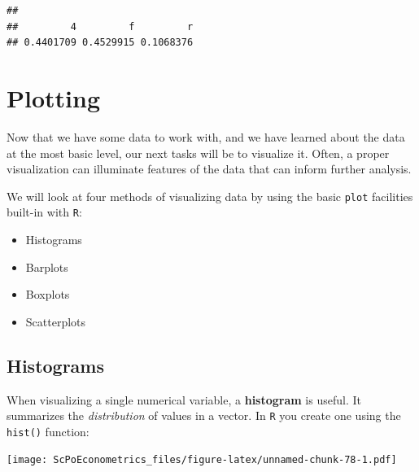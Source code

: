 \documentclass[]{book}
\newenvironment{Shaded}{\begin{snugshade}}{\end{snugshade}}
\newcommand{\KeywordTok}[1]{\textcolor[rgb]{0.13,0.29,0.53}{\textbf{#1}}}
\newcommand{\StringTok}[1]{\textcolor[rgb]{0.31,0.60,0.02}{#1}}
\newcommand{\OperatorTok}[1]{\textcolor[rgb]{0.81,0.36,0.00}{\textbf{#1}}}
\newcommand{\NormalTok}[1]{#1}
\providecommand{\tightlist}{%
  \setlength{\itemsep}{0pt}\setlength{\parskip}{0pt}}
\theoremstyle{definition}
\theoremstyle{definition}
\theoremstyle{definition}
\theoremstyle{remark}
\begin{document}
\begin{Shaded}
\end{Shaded}

\begin{verbatim}
## 
##         4         f         r 
## 0.4401709 0.4529915 0.1068376
\end{verbatim}

\section{Plotting}\label{plotting}

Now that we have some data to work with, and we have learned about the
data at the most basic level, our next tasks will be to visualize it.
Often, a proper visualization can illuminate features of the data that
can inform further analysis.

We will look at four methods of visualizing data by using the basic
\texttt{plot} facilities built-in with \texttt{R}:

\begin{itemize}
\tightlist
\item
  Histograms
\item
  Barplots
\item
  Boxplots
\item
  Scatterplots
\end{itemize}

\subsection{Histograms}\label{histograms}

When visualizing a single numerical variable, a \textbf{histogram} is
useful. It summarizes the \emph{distribution} of values in a vector. In
\texttt{R} you create one using the \texttt{hist()} function:

\begin{Shaded}
\end{Shaded}

\texttt{[image: ScPoEconometrics\_files/figure-latex/unnamed-chunk-78-1.pdf]}
\end{document}
